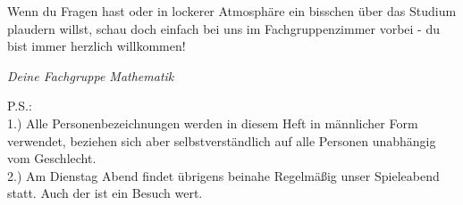 
Wenn du Fragen hast oder in lockerer Atmosphäre
ein bisschen über das Studium plaudern willst,
schau doch einfach bei uns im Fachgruppenzimmer vorbei
- du bist immer herzlich willkommen!

\begin{flushright}{ \it Deine Fachgruppe Mathematik}
\end{flushright}
\vspace*{\fill}
{\small P.S.:\\
1.) Alle Personenbezeichnungen werden in diesem Heft
in männlicher Form verwendet,
beziehen sich aber selbstverständlich
auf alle Personen unabhängig vom Geschlecht.\\[2pt]
2.) Am Dienstag Abend findet übrigens beinahe Regelmäßig
unser Spieleabend statt.
Auch der ist ein Besuch wert.}

